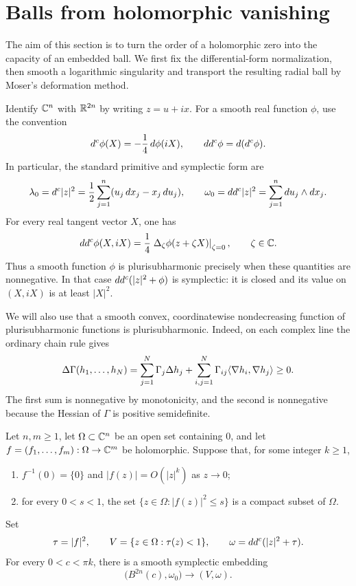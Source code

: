\section{Balls from holomorphic vanishing}
\label{sec:ball}

The aim of this section is to turn the order of a holomorphic zero into
the capacity of an embedded ball. We first fix the differential-form
normalization, then smooth a logarithmic singularity and transport the
resulting radial ball by Moser's deformation method.

Identify $\mathbb C^n$ with $\mathbb R^{2n}$ by writing $z=u+ix$.  For a smooth real
function $\phi$, use the convention
\[
 d^c\phi(X)=-\frac14\,d\phi(iX),
 \qquad dd^c\phi=d(d^c\phi).
\]
In particular, the standard primitive and symplectic form are
\begin{equation}
 \lambda_0=d^c|z|^2
   =\frac12\sum_{j=1}^n(u_j\,dx_j-x_j\,du_j),
 \qquad
 \omega_0=dd^c|z|^2=\sum_{j=1}^n du_j\wedge dx_j.
 \label{eq:ball-normalization}
\end{equation}
For every real tangent vector $X$, one has
\[
 dd^c\phi(X,iX)
 =\frac14\left.\Delta_{\zeta}\phi(z+\zeta X)\right|_{\zeta=0},
 \qquad \zeta\in\mathbb C.
\]
Thus a smooth function $\phi$ is plurisubharmonic precisely when these
quantities are nonnegative.  In that case $dd^c(|z|^2+\phi)$ is symplectic:
it is closed and its value on $(X,iX)$ is at least $|X|^2$.

We will also use that a smooth convex, coordinatewise nondecreasing
function of plurisubharmonic functions is plurisubharmonic.  Indeed, on
each complex line the ordinary chain rule gives
\[
 \Delta\Gamma(h_1,\ldots,h_N)
 =\sum_{j=1}^N\Gamma_j\Delta h_j
   +\sum_{i,j=1}^N\Gamma_{ij}
        \langle \nabla h_i,\nabla h_j\rangle\ge0.
\]
The first sum is nonnegative by monotonicity, and the second is
nonnegative because the Hessian of $\Gamma$ is positive semidefinite.

\begin{theorem}
\label{thm:holomorphic-ball}
Let $n,m\ge1$, let $\Omega\subset\mathbb C^n$ be an open set containing $0$,
and let $f=(f_1,\ldots,f_m):\Omega\to\mathbb C^m$ be holomorphic.  Suppose that,
for some integer $k\ge1$,
\begin{enumerate}[label=\textup{(\roman*)}]
 \item $f^{-1}(0)=\{0\}$ and $|f(z)|=O(|z|^k)$ as $z\to0$;
 \item for every $0<s<1$, the set
 $\{z\in\Omega:|f(z)|^2\le s\}$ is a compact subset of $\Omega$.
\end{enumerate}
Set
\[
 \tau=|f|^2,\qquad V=\{z\in\Omega:\tau(z)<1\},
 \qquad \omega=dd^c(|z|^2+\tau).
\]
For every $0<c<\pi k$, there is a smooth symplectic embedding
\[
 \bigl(B^{2n}(c),\omega_0\bigr)\longrightarrow(V,\omega).
\]
\end{theorem}

